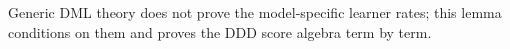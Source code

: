 Generic DML theory does not prove the model-specific learner rates; this lemma conditions on them and proves the DDD score algebra term by term.